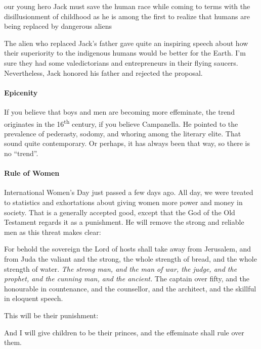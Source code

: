 \begin{quotex}
our young hero Jack must save the human race while coming to terms with the disillusionment of childhood as he is among the first to realize that humans are being replaced by dangerous aliens
\end{quotex}


The alien who replaced Jack's father gave quite an inspiring speech about how their superiority to the indigenous humans would be better for the Earth. I'm sure they had some valedictorians and entrepreneurs in their flying saucers. Nevertheless, Jack honored his father and rejected the proposal.

\paragraph{Epicenity}


If you believe that boys and men are becoming more effeminate, the trend originates in the 16\textsuperscript{th} century, if you believe Campanella. He pointed to the prevalence of pederasty, sodomy, and whoring among the literary elite. That sound quite contemporary. Or perhaps, it has always been that way, so there is no ``trend''.

\paragraph{Rule of Women}


International Women's Day just passed a few days ago. All day, we were treated to statistics and exhortations about giving women more power and money in society. That is a generally accepted good, except that the God of the Old Testament regards it as a punishment. He will remove the strong and reliable men as this threat makes clear:

\begin{quotex}
For behold the sovereign the Lord of hosts shall take away from Jerusalem, and from Juda the valiant and the strong, the whole strength of bread, and the whole strength of water. \emph{The strong man, and the man of war, the judge, and the prophet, and the cunning man, and the ancient.} The captain over fifty, and the honourable in countenance, and the counsellor, and the architect, and the skillful in eloquent speech.
\end{quotex}


This will be their punishment:

\begin{quotex}
And I will give children to be their princes, and the effeminate shall rule over them.
\end{quotex}


